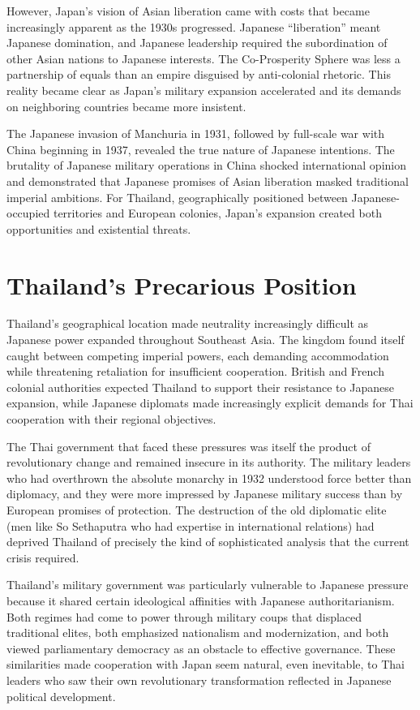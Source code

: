 \documentclass[
  Letterpaper,
]{scrbook}
\begin{document}
However, Japan's vision of Asian liberation came with costs that became
increasingly apparent as the 1930s progressed. Japanese ``liberation''
meant Japanese domination, and Japanese leadership required the
subordination of other Asian nations to Japanese interests. The
Co-Prosperity Sphere was less a partnership of equals than an empire
disguised by anti-colonial rhetoric. This reality became clear as
Japan's military expansion accelerated and its demands on neighboring
countries became more insistent.

The Japanese invasion of Manchuria in 1931, followed by full-scale war
with China beginning in 1937, revealed the true nature of Japanese
intentions. The brutality of Japanese military operations in China
shocked international opinion and demonstrated that Japanese promises of
Asian liberation masked traditional imperial ambitions. For Thailand,
geographically positioned between Japanese-occupied territories and
European colonies, Japan's expansion created both opportunities and
existential threats.

\section{Thailand's Precarious
Position}\label{thailands-precarious-position}

Thailand's geographical location made neutrality increasingly difficult
as Japanese power expanded throughout Southeast Asia. The kingdom found
itself caught between competing imperial powers, each demanding
accommodation while threatening retaliation for insufficient
cooperation. British and French colonial authorities expected Thailand
to support their resistance to Japanese expansion, while Japanese
diplomats made increasingly explicit demands for Thai cooperation with
their regional objectives.

The Thai government that faced these pressures was itself the product of
revolutionary change and remained insecure in its authority. The
military leaders who had overthrown the absolute monarchy in 1932
understood force better than diplomacy, and they were more impressed by
Japanese military success than by European promises of protection. The
destruction of the old diplomatic elite (men like So Sethaputra who had
expertise in international relations) had deprived Thailand of precisely
the kind of sophisticated analysis that the current crisis required.

Thailand's military government was particularly vulnerable to Japanese
pressure because it shared certain ideological affinities with Japanese
authoritarianism. Both regimes had come to power through military coups
that displaced traditional elites, both emphasized nationalism and
modernization, and both viewed parliamentary democracy as an obstacle to
effective governance. These similarities made cooperation with Japan
seem natural, even inevitable, to Thai leaders who saw their own
revolutionary transformation reflected in Japanese political
development.
\end{document}
